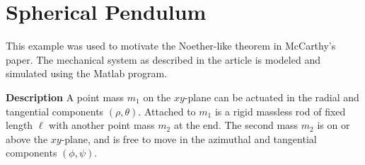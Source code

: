 \documentclass[main.tex]{subfiles}
\begin{document}
\section{Spherical Pendulum}\label{sec:sphericalpendulum} 
This example was used to motivate the Noether-like theorem in McCarthy's paper. The mechanical system as described in the article is modeled and simulated using the Matlab program.

\textbf{Description} 
A point mass $m_1$ on the $xy$-plane can be actuated in the radial and tangential components $(\rho,\theta)$. Attached to $m_1$ is a rigid massless rod of fixed length $\ell$ with another point mass $m_2$ at the end. The second mass $m_2$ is on or above the $xy$-plane, and is free to move in the azimuthal and tangential components $(\phi,\psi)$.
\end{document}
